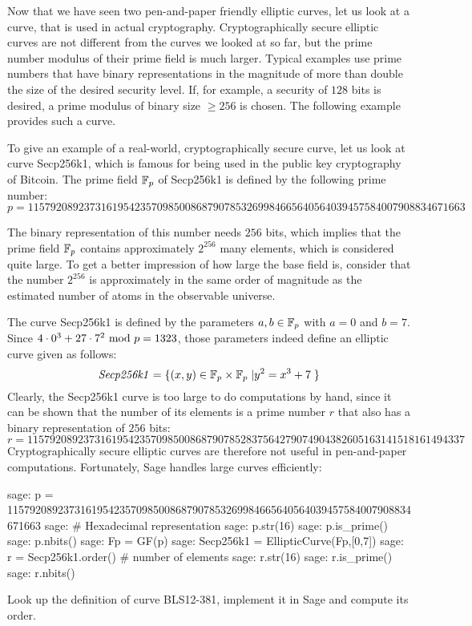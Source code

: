 Now that we have seen two pen-and-paper friendly elliptic curves, let us look at a curve, that is used in actual cryptography. Cryptographically secure elliptic curves are not  different from the curves we looked at so far, but the prime number modulus of their prime field is much larger. Typical examples use prime numbers that have binary representations in the magnitude of more than double the size of the desired security level. If, for example, a security of $128$ bits is desired, a prime modulus of binary size $\geq 256$ is chosen. The following example provides such a curve. 

\begin{example}\label{Secp256k1}
To give an example of a real-world, cryptographically secure curve, let us look at curve Secp256k1, which is famous for being used in the public key cryptography of Bitcoin. The prime field $\mathbb{F}_p$ of Secp256k1 is defined by the following prime number:
$$
p = \scriptstyle 115792089237316195423570985008687907853269984665640564039457584007908834671663
$$
 
 The binary representation of this number needs $256$ bits, which implies that the prime field $\mathbb{F}_p$  contains approximately $2^{256}$ many elements, which is considered quite large. To get a better impression of how large the base field is, consider that the number $2^{256}$ is approximately in the same order of magnitude as the estimated number of atoms in the observable universe. 

The curve Secp256k1 is defined by the parameters $a,b\in \mathbb{F}_p$ with $a=0$ and $b=7$. Since $4\cdot 0^3 + 27\cdot 7^2 \text{ mod } p=1323$, those parameters indeed define an elliptic curve given as follows:
$$
\mathit{Secp256k1} = \{(x,y)\in \mathbb{F}_p\times \mathbb{F}_p\;| y^2 = x^3 +7\;\} 
$$
Clearly, the Secp256k1 curve is too large to do computations by hand, since it can be shown that  the number of its elements is a prime number $r$ that also has a binary representation of $256$ bits:
$$
r = \scriptstyle 11579208923731619542357098500868790785283756427907490438260516
3141518161494337
$$
Cryptographically secure elliptic curves are therefore not useful in pen-and-paper computations. Fortunately, Sage handles large curves efficiently:
\begin{sagecommandline}
sage: p = 115792089237316195423570985008687907853269984665640564039457584007908834671663
sage: # Hexadecimal representation
sage: p.str(16)
sage: p.is_prime()
sage: p.nbits()
sage: Fp = GF(p)
sage: Secp256k1 = EllipticCurve(Fp,[0,7])
sage: r = Secp256k1.order() # number of elements
sage: r.str(16)
sage: r.is_prime()
sage: r.nbits()
\end{sagecommandline}
\end{example}
\begin{exercise}
Look up the definition of curve BLS12-381, implement it in Sage and compute its order.
\end{exercise}


